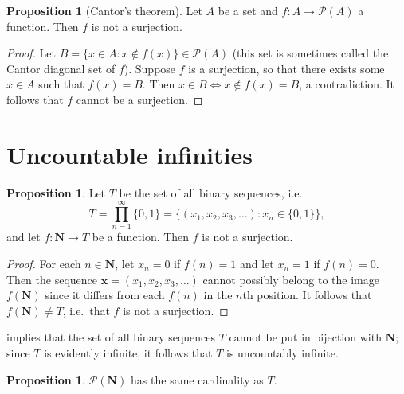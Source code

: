 \documentclass[12pt]{article}
\theoremstyle{definition}
\newtheorem{proposition}[definition]{Proposition}
\newcommand{\N}{\mathbf{N}}
\begin{document}
\begin{proposition}[Cantor's theorem]
\label{prop:no_surjection_from_set_to_power_set}
    Let \( A \) be a set and \( f : A \to \mathscr{P}(A) \) a function. Then \( f \) is not a surjection.
\end{proposition}

\begin{proof}
    Let \( B = \{ x \in A : x \not\in f(x) \} \in \mathscr{P}(A) \) (this set is sometimes called the Cantor diagonal set of \( f \)). Suppose \( f \) is a surjection, so that there exists some \( x \in A \) such that \( f(x) = B \). Then \( x \in B \iff x \not\in f(x) = B \), a contradiction. It follows that \( f \) cannot be a surjection.
\end{proof}

\section{Uncountable infinities}
\label{sec:uncountable_infinities}

\begin{proposition}
\label{prop:no_surjection_from_N_to_set_of_binary_sequences}
    Let \( T \) be the set of all binary sequences, i.e.\
    \[
        T = \prod_{n=1}^{\infty} \{ 0, 1 \} = \{ (x_1, x_2, x_3, \ldots) : x_n \in \{ 0, 1 \} \},
    \]
    and let \( f : \N \to T \) be a function. Then \( f \) is not a surjection.
\end{proposition}

\begin{proof}
    For each \( n \in \N \), let \( x_n = 0 \) if \( f(n) = 1 \) and let \( x_n = 1 \) if \( f(n) = 0 \). Then the sequence \( \bm{x} = (x_1, x_2, x_3, \ldots) \) cannot possibly belong to the image \( f(\N) \) since it differs from each \( f(n) \) in the \( n \)th position. It follows that \( f(\N) \neq T \), i.e.\ that \( f \) is not a surjection.
\end{proof}

 implies that the set of all binary sequences \( T \) cannot be put in bijection with \( \N \); since \( T \) is evidently infinite, it follows that \( T \) is uncountably infinite.

\begin{proposition}
\label{prop:set_of_binary_sequences_in_bijection_with_power_set_of_naturals}
    \( \mathscr{P}(\N) \) has the same cardinality as \( T \).
\end{proposition}
\end{document}
